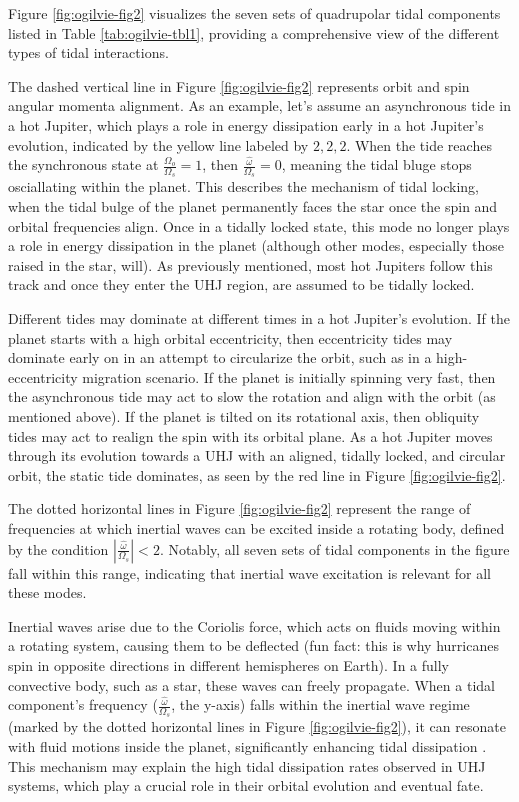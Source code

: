\documentclass[oneside,12pt]{amsart}
\numberwithin{page}{section}
\begin{document}
Figure \ref{fig:ogilvie-fig2} visualizes the seven sets of quadrupolar tidal components listed in Table \ref{tab:ogilvie-tbl1}, providing a comprehensive view of the different types of tidal interactions.

The dashed vertical line in Figure \ref{fig:ogilvie-fig2} represents orbit and spin angular momenta alignment. As an example, let's assume an asynchronous tide in a hot Jupiter, which plays a role in energy dissipation early in a hot Jupiter's evolution, indicated by the yellow line labeled by $2, 2, 2$. When the tide reaches the synchronous state at $\frac{\Omega_o}{\Omega_s} = 1$, then $\frac{\hat{\omega}}{\Omega_s} = 0$, meaning the tidal bluge stops osciallating within the planet. This describes the mechanism of tidal locking, when the tidal bulge of the planet permanently faces the star once the spin and orbital frequencies align. Once in a tidally locked state, this mode no longer plays a role in energy dissipation in the planet (although other modes, especially those raised in the star, will). As previously mentioned, most hot Jupiters follow this track and once they enter the UHJ region, are assumed to be tidally locked.

Different tides may dominate at different times in a hot Jupiter's evolution. If the planet starts with a high orbital eccentricity, then eccentricity tides may dominate early on in an attempt to circularize the orbit, such as in a high-eccentricity migration scenario. If the planet is initially spinning very fast, then the asynchronous tide may act to slow the rotation and align with the orbit (as mentioned above). If the planet is tilted on its rotational axis, then obliquity tides may act to realign the spin with its orbital plane. As a hot Jupiter moves through its evolution towards a UHJ with an aligned, tidally locked, and circular orbit, the static tide dominates, as seen by the red line in Figure \ref{fig:ogilvie-fig2}.

The dotted horizontal lines in Figure \ref{fig:ogilvie-fig2} represent the range of frequencies at which inertial waves can be excited inside a rotating body, defined by the condition $|\frac{\hat{\omega}}{\Omega_s}| < 2$. Notably, all seven sets of tidal components in the figure fall within this range, indicating that inertial wave excitation is relevant for all these modes.

Inertial waves arise due to the Coriolis force, which acts on fluids moving within a rotating system, causing them to be deflected (fun fact: this is why hurricanes spin in opposite directions in different hemispheres on Earth). In a fully convective body, such as a star, these waves can freely propagate. When a tidal component’s frequency ($\frac{\hat{\omega}}{\Omega_s}$, the y-axis) falls within the inertial wave regime (marked by the dotted horizontal lines in Figure \ref{fig:ogilvie-fig2}), it can resonate with fluid motions inside the planet, significantly enhancing tidal dissipation \citep{ogilvie2014tidal}. This mechanism may explain the high tidal dissipation rates observed in UHJ systems, which play a crucial role in their orbital evolution and eventual fate.
\end{document}
